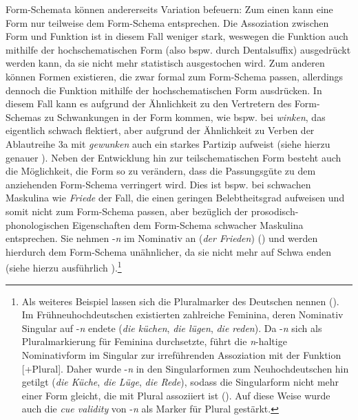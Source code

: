 
\begin{sloppypar}
Form-Schemata können andererseits Variation befeuern: Zum einen kann eine Form nur teilweise dem Form-Schema entsprechen. Die Assoziation zwischen Form und Funktion ist in diesem Fall weniger stark, weswegen die Funktion auch mithilfe der hochschematischen Form (also bspw. durch Dentalsuffix) ausgedrückt werden kann, da sie nicht mehr statistisch ausgestochen wird. Zum anderen können Formen existieren, die zwar formal zum Form-Schema passen, allerdings dennoch die Funktion mithilfe der hochschematischen Form ausdrücken. In diesem Fall kann es aufgrund der Ähnlichkeit zu den Vertretern des Form-Schemas zu Schwankungen in der Form kommen, wie bspw. bei  \textit{winken}, das eigentlich schwach flektiert, aber aufgrund der Ähnlichkeit zu Verben der Ablautreihe 3a mit \textit{gewunken} auch ein starkes Partizip aufweist (siehe hierzu genauer ). Neben der Entwicklung hin zur teilschematischen Form besteht auch die Möglichkeit, die Form so zu verändern, dass die Passungsgüte zu dem anziehenden Form-Schema verringert wird. Dies ist bspw. bei schwachen Maskulina wie \textit{Friede} der Fall, die einen geringen Belebtheitsgrad aufweisen und somit nicht zum Form-Schema passen, aber bezüglich der prosodisch-phonologischen Eigenschaften dem Form-Schema schwacher Maskulina entsprechen. Sie nehmen -\textit{n} im Nominativ an (\textit{der Frieden}) (\cite[173]{Kopcke.1995}) und werden hierdurch dem Form-Schema unähnlicher, da sie nicht mehr auf Schwa enden (siehe hierzu ausführlich ).\footnote{Als weiteres Beispiel lassen sich die Pluralmarker des Deutschen nennen (\cite[119--120]{Kopcke.1993}). Im Frühneuhochdeutschen existierten zahlreiche Feminina, deren Nominativ Singular auf -\textit{n} endete (\textit{die küchen}, \textit{die lügen}, \textit{die reden}). Da -\textit{n} sich als Pluralmarkierung für Feminina durchsetzte, führt die \textit{n}-haltige Nominativform im Singular zur irreführenden Assoziation mit der Funktion [+Plural]. Daher wurde -\textit{n} in den Singularformen zum Neuhochdeutschen hin getilgt (\textit{die Küche}, \textit{die Lüge}, \textit{die Rede}), sodass die Singularform nicht mehr einer Form gleicht, die mit Plural assoziiert ist (\cite[119]{Kopcke.1993}). Auf diese Weise wurde auch die \textit{cue validity} von -\textit{n} als Marker für Plural gestärkt.}
\end{sloppypar}

